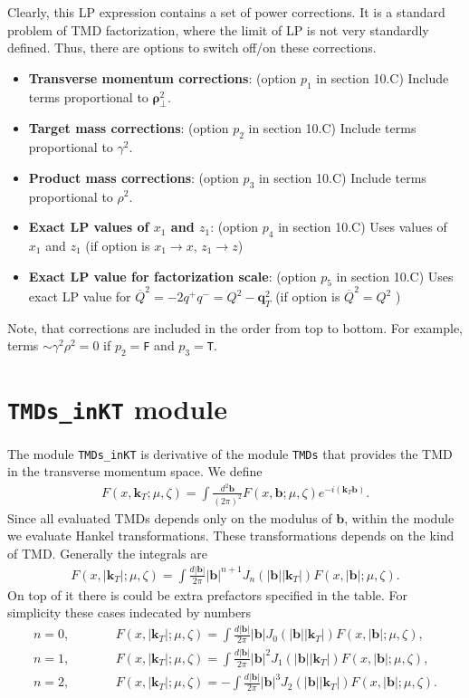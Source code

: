 \documentclass[prd,nofootinbib,eqsecnum,final]{revtex4}
\renewcommand{\(}{\left(}
\renewcommand{\)}{\right)}
\renewcommand{\[}{\left[}
\renewcommand{\]}{\right]}
\renewcommand{\vec}[1]{\bm{#1}}
\begin{document}
Clearly, this LP expression contains a set of power corrections. It is a standard problem of TMD factorization, where the limit of LP is not very standardly defined. Thus, there are options to switch off/on these corrections.
\begin{itemize}
\item \textbf{Transverse momentum corrections}: (option $p_1$ in section 10.C) Include terms proportional to $\vec \rho_\perp^2$.
\item \textbf{Target mass corrections}: (option $p_2$ in section 10.C) Include terms proportional to $\gamma^2$.
\item \textbf{Product mass corrections}: (option $p_3$ in section 10.C) Include terms proportional to $\rho^2$.
\item \textbf{Exact LP values of $x_1$ and $z_1$}: (option $p_4$ in section 10.C) Uses values of $x_1$ and $z_1$ (if option is  $x_1\to x$, $z_1\to z$)
\item \textbf{Exact LP value for factorization scale}: (option $p_5$ in section 10.C) Uses exact LP value for $\overline{Q}^2=-2q^+q^-=Q^2-\vec q_T^2$ (if option is  $\overline{Q}^2=Q^2$ )
\end{itemize}
Note, that corrections are included in the order from top to bottom. For example, terms $\sim \gamma^2 \rho^2=0$ if $p_2=$\texttt{F} and $p_3=$\texttt{T}.

\newpage
\section{\texttt{TMDs\_inKT} module}
\label{TMDs-inKT}

The module \texttt{TMDs\_inKT} is derivative of the module \texttt{TMDs} that provides the TMD in the transverse momentum space. We define
\begin{eqnarray}
F(x,\vec k_T;\mu,\zeta)=\int \frac{d^2\vec b}{(2\pi)^2}F(x,\vec b;\mu,\zeta)e^{-i(\vec k_T \vec b)}.
\end{eqnarray}
Since all evaluated TMDs depends only on the modulus of $\vec b$, within the module we evaluate Hankel transformations. These transformations depends on the kind of TMD. Generally the integrals are
\begin{eqnarray}\label{kT-J0}
F(x,|\vec k_T|;\mu,\zeta)=\int \frac{d|\vec b|}{2\pi}|\vec  b|^{n+1} J_n(|\vec b||\vec k_T|) F(x,|\vec b|;\mu,\zeta).
\end{eqnarray}
On top of it there is could be extra prefactors specified in the table. For simplicity these cases indecated by numbers
\begin{eqnarray}
n=0,&\qquad &F(x,|\vec k_T|;\mu,\zeta)=\int \frac{d|\vec b|}{2\pi}|\vec  b| J_0(|\vec b||\vec k_T|) F(x,|\vec b|;\mu,\zeta),
\\
n=1,&\qquad &F(x,|\vec k_T|;\mu,\zeta)=\int \frac{d|\vec b|}{2\pi}|\vec  b|^2 J_1(|\vec b||\vec k_T|) F(x,|\vec b|;\mu,\zeta),
\\
n=2,&\qquad &F(x,|\vec k_T|;\mu,\zeta)=-\int \frac{d|\vec b|}{2\pi}|\vec  b|^3 J_2(|\vec b||\vec k_T|) F(x,|\vec b|;\mu,\zeta).
\end{eqnarray}
\end{document}

